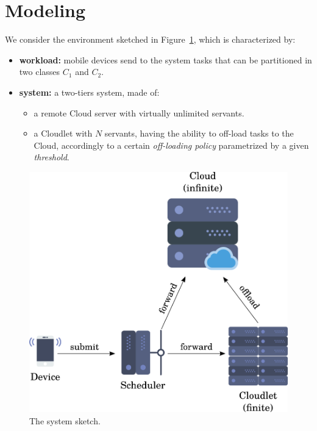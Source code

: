 \section{Modeling}
\label{sec:modeling}


We consider the environment sketched in Figure~\ref{fig:modeling-system-sketch}, which is characterized by:

\begin{itemize}
	\item  \textbf{workload:} mobile devices send to the system tasks that can be partitioned in two classes $C_{1}$ and $C_{2}$.
	\item \textbf{system:} a two-tiers system, made of:	
	\begin{itemize}
		\item a remote Cloud server with virtually unlimited servants.
		\item a Cloudlet with $N$ servants, having the ability to off-load tasks to the Cloud, accordingly to a certain \textit{off-loading policy} parametrized by a given \textit{threshold}.
	\end{itemize}
\end{itemize}

\begin{figure}
	\includegraphics[width=\columnwidth]{fig/modeling-system-sketch}
	\caption{The system sketch.}
	\label{fig:modeling-system-sketch}
\end{figure}


